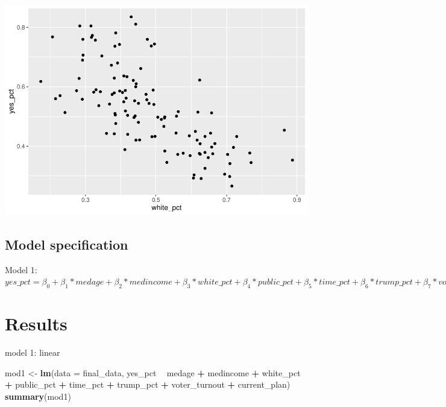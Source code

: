 \documentclass[
]{article}
\newenvironment{Shaded}{\begin{snugshade}}{\end{snugshade}}
\newcommand{\DataTypeTok}[1]{\textcolor[rgb]{0.13,0.29,0.53}{#1}}
\newcommand{\KeywordTok}[1]{\textcolor[rgb]{0.13,0.29,0.53}{\textbf{#1}}}
\newcommand{\NormalTok}[1]{#1}
\newcommand{\OperatorTok}[1]{\textcolor[rgb]{0.81,0.36,0.00}{\textbf{#1}}}
\newcommand{\StringTok}[1]{\textcolor[rgb]{0.31,0.60,0.02}{#1}}
\begin{document}
\includegraphics{Zhong_paper_files/figure-latex/unnamed-chunk-3-1.pdf}

\hypertarget{model-specification}{%
\subsection{Model specification}\label{model-specification}}

Model 1:
\(yes\_pct = \beta_0+\beta_1*medage+\beta_2*medincome+\beta_3*white\_pct+\beta_4*public\_pct+\beta_5*time\_pct+\beta_6*trump\_pct+\beta_7*voter\_turnout+\beta_8*current\_plan+\epsilon\)

\hypertarget{results}{%
\section{Results}\label{results}}

model 1: linear

\begin{Shaded}
\begin{Highlighting}[]
\NormalTok{mod1 <-}\StringTok{ }\KeywordTok{lm}\NormalTok{(}\DataTypeTok{data =}\NormalTok{ final_data, yes_pct }\OperatorTok{~}\StringTok{ }\NormalTok{medage }\OperatorTok{+}\StringTok{ }\NormalTok{medincome }\OperatorTok{+}\StringTok{ }\NormalTok{white_pct }
           \OperatorTok{+}\StringTok{ }\NormalTok{public_pct }\OperatorTok{+}\StringTok{ }\NormalTok{time_pct }\OperatorTok{+}\StringTok{ }\NormalTok{trump_pct }\OperatorTok{+}\StringTok{ }\NormalTok{voter_turnout }\OperatorTok{+}
\StringTok{              }\NormalTok{current_plan)}
\KeywordTok{summary}\NormalTok{(mod1)}
\end{Highlighting}
\end{Shaded}
\end{document}
